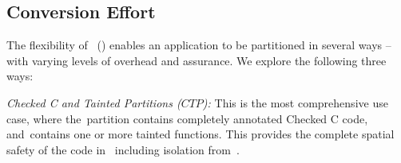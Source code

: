 
\subsection{Conversion Effort}
The flexibility of~\systemname{} () enables an application to be partitioned in several ways -- with varying levels of overhead and assurance. We explore the following three ways:

\noindent\emph{Checked C and Tainted Partitions ($CTP$):} This is the most comprehensive use case, where the~\cregion partition contains completely annotated Checked C code, and~\ucregion contains one or more tainted functions.
This provides the complete spatial safety of the code in~\cregion{} including isolation from~\ucregion{}.


